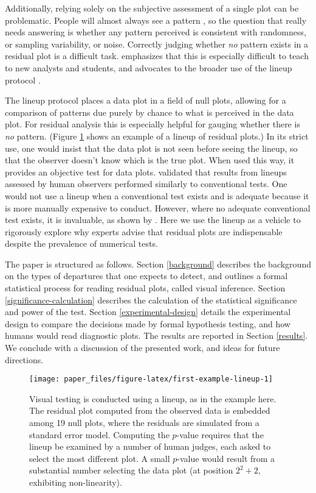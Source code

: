 \documentclass[]{interact}
\theoremstyle{plain}%
\theoremstyle{definition}
\theoremstyle{remark}
\begin{document}
Additionally, relying solely on the subjective assessment of a single
plot can be problematic. People will almost always see a pattern
\citep[see][]{kahneman2011thinking}, so the question that really needs
answering is whether any pattern perceived is consistent with
randomness, or sampling variability, or noise. Correctly judging whether
\emph{no} pattern exists in a residual plot is a difficult task.
\cite{loy2021bringing} emphasizes that this is especially difficult to
teach to new analysts and students, and advocates to the broader use of
the lineup protocol \citep{bujastatistical2009}.

The lineup protocol places a data plot in a field of null plots,
allowing for a comparison of patterns due purely by chance to what is
perceived in the data plot. For residual analysis this is especially
helpful for gauging whether there is \emph{no} pattern. (Figure
\ref{fig:first-example-lineup} shows an example of a lineup of residual
plots.) In its strict use, one would insist that the data plot is not
seen before seeing the lineup, so that the observer doesn't know which
is the true plot. When used this way, it provides an objective test for
data plots. \cite{majumdervalidation2013} validated that results from
lineups assessed by human observers performed similarly to conventional
tests. One would not use a lineup when a conventional test exists and is
adequate because it is more manually expensive to conduct. However,
where no adequate conventional test exists, it is invaluable, as shown
by \cite{loy2013diagnostic}. Here we use the lineup as a vehicle to
rigorously explore why experts advise that residual plots are
indispensable despite the prevalence of numerical tests.

The paper is structured as follows. Section \ref{background} describes
the background on the types of departures that one expects to detect,
and outlines a formal statistical process for reading residual plots,
called visual inference. Section \ref{significance-calculation}
describes the calculation of the statistical significance and power of
the test. Section \ref{experimental-design} details the experimental
design to compare the decisions made by formal hypothesis testing, and
how humans would read diagnostic plots. The results are reported in
Section \ref{results}. We conclude with a discussion of the presented
work, and ideas for future directions.

\begin{figure}[t!]

{\centering \texttt{[image: paper\_files/figure-latex/first-example-lineup-1]} 

}

\caption{Visual testing is conducted using a lineup, as in the example here. The residual plot computed from the observed data is embedded among 19 null plots, where the residuals are simulated from a standard error model. Computing the $p$-value requires that the lineup be examined by a number of human judges, each asked to select the most different plot. A small $p$-value would result from a substantial number selecting the data plot (at position $2^2 + 2$, exhibiting non-linearity).}\label{fig:first-example-lineup}
\end{figure}
\end{document}
